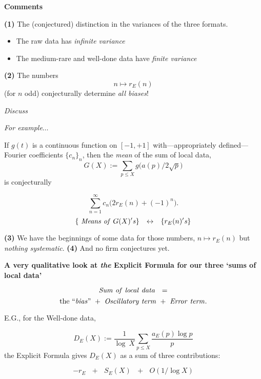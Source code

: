 \documentclass[12pt]{beamer}
\theoremstyle{definition}
\begin{document}
 \begin{frame}
{\Large  \vskip20pt  \centerline{ \bf Comments}
\vskip20pt {\bf(1)}  The (conjectured) distinction in the variances of the three formats.\vskip20pt
  \begin{itemize} \item   The raw data has {\it infinite variance} \item The medium-rare and well-done data have {\it finite variance}\end{itemize}} \end{frame}
 \begin{frame}
{\Large  \vskip20pt   {\bf(2)} The numbers \vskip20pt $$n \mapsto r_E(n)$$ \vskip20pt (for $n$ odd) conjecturally determine {\it all biases}!} \vskip20pt \centerline{\it Discuss}\end{frame}
 \begin{frame}\vskip20pt
{\Large  \vskip20pt  \centerline{\it For example$\dots$}  \vskip20pt   If    $g(t)$ is a continuous function on $[-1,+1]$  with---appropriately defined---Fourier coefficients $\{c_n\}_n$, then the {\it mean} of the sum of local data,  $$G(X):= \sum_{p\le X}g\big(a(p)/2{\sqrt p}\big)$$  is conjecturally}\end{frame}
 \begin{frame}\vskip20pt
{\Large  \vskip20pt    $$\sum_{n=1}^{\infty}  c_n\big(2r_E(n)+(-1)^n\big).$$\vskip20pt
$$\{ {\rm{\it  \  Means\ of\ }} G(X){\rm{\it 's}}\} \ \ \  {\leftrightarrow}\ \ \  \{r_E(n){\rm{\it 's}}\}$$}\end{frame}
 \begin{frame}\vskip20pt
{\Large  \vskip20pt
  {\bf(3)} We have the beginnings of some data for those numbers, $n \mapsto r_E(n)$
 \vskip20pt
 but {\it nothing systematic}.  \vskip20pt
  {\bf(4)} And no firm conjectures yet.}\end{frame}


 \begin{frame}\vskip20pt
{\Large  \vskip20pt {\bf A very qualitative look at {\it the} Explicit Formula for our three `sums of local data'}


  $${\rm{\it Sum\ of\ local\ data\  }}  \ = $$
   \vskip20pt
  $$  {\rm the\ {\it ``bias"}}\ + \  {\rm{\it  Oscillatory\ term}}\ + \  {\rm{\it  Error\ term}}.$$ }\end{frame}

 \begin{frame}\vskip20pt
{\Large  \vskip20pt   E.G., for the Well-done data,

$${D}_E(X):= {\frac{1}{\log\ X}}\sum_{p \le X}{\frac{a_E(p)\log p}{ p}}$$
the Explicit Formula gives ${D}_E(X)$ as  a sum of three contributions:

$$-r_E\ \ \  +\ \ \  S_E(X)\ \ \  +\ \ \  O(1/\log X)$$}\end{frame}
\end{document}
